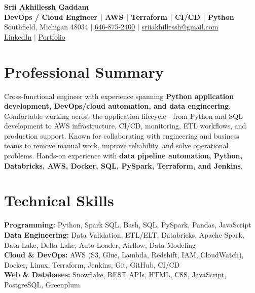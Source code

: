 \documentclass[letterpaper,10pt]{article}
\begin{document}
\fontsize{9.35pt}{10.45pt}\selectfont

\begin{center}
    {\LARGE \textbf{Srii Akhillessh Gaddam}} \\[-1pt]
    \textbf{DevOps / Cloud Engineer | AWS | Terraform | CI/CD | Python} \\[2pt]
    Southfield, Michigan 48034 $|$
    \href{tel:6468752400}{646-875-2400} $|$
    \href{mailto:sriiakhillessh@gmail.com}{sriiakhillessh@gmail.com} \\[1pt]
    \href{https://www.linkedin.com/in/srii-akhiilessh-gaddam-b48668191/}{LinkedIn} $|$
    \href{https://sriiakhillesshg.github.io/portfolio/}{Portfolio}
\end{center}
\vspace{-8pt}

\section{Professional Summary}
\small{Cross-functional engineer with experience spanning \textbf{Python application development, DevOps/cloud automation, and data engineering}. Comfortable working across the application lifecycle - from Python and SQL development to AWS infrastructure, CI/CD, monitoring, ETL workflows, and production support. Known for collaborating with engineering and business teams to remove manual work, improve reliability, and solve operational problems. Hands-on experience with \textbf{data pipeline automation, Python, Databricks, AWS, Docker, SQL, PySpark, Terraform, and Jenkins}.}

\section{Technical Skills}
\small{
\textbf{Programming:} Python, Spark SQL, Bash, SQL, PySpark, Pandas, JavaScript \\
\textbf{Data Engineering:} Data Validation, ETL/ELT, Databricks, Apache Spark, Data Lake, Delta Lake, Auto Loader, Airflow, Data Modeling \\
\textbf{Cloud \& DevOps:} AWS (S3, Glue, Lambda, Redshift, IAM, CloudWatch), Docker, Linux, Terraform, Jenkins, Git, GitHub, CI/CD \\
\textbf{Web \& Databases:} Snowflake, REST APIs, HTML, CSS, JavaScript, PostgreSQL, Greenplum
}
\end{document}

